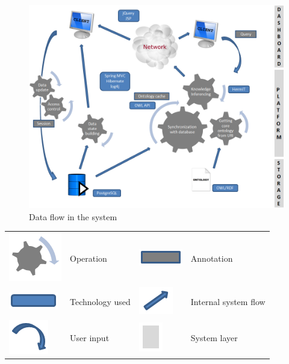\begin{figure}[htp]
\centering
\includegraphics[scale=0.5]{images/chapter4/Flow}
\caption{Data flow in the system}
\label{fig:flow}
\end{figure}

\begin{tabular}[htb]{m{2cm}m{6cm}m{2cm}m{6cm}}
    \includegraphics[scale=0.7]{images/chapter4/OperationIcon}      & Operation         & \includegraphics[scale=0.7]{images/chapter4/AnnotationIcon}       & Annotation \\
    \includegraphics[scale=0.7]{images/chapter4/TechnologyIcon}     & Technology used   & \includegraphics[scale=0.7]{images/chapter4/SystemFlowIcon}       & Internal system flow \\
    \includegraphics[scale=0.7]{images/chapter4/UserInputIcon}      & User input        & \includegraphics[scale=0.7]{images/chapter4/SystemPartNameIcon}   & System layer
\end{tabular}

